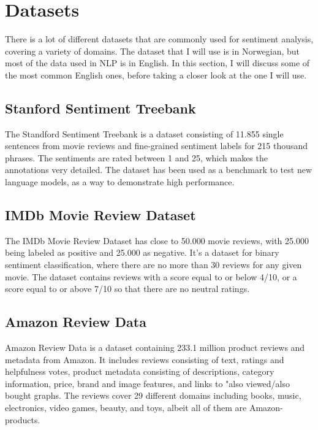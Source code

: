\documentclass{report}
\begin{document}


\section{Datasets}
There is a lot of different datasets that are commonly used for sentiment analysis, covering a variety of domains. The dataset that I will use is in Norwegian, but most of the data used in NLP is in English. In this section, I will discuss some of the most common English ones, before taking a closer look at the one I will use.
\subsection{Stanford Sentiment Treebank}
The Standford Sentiment Treebank \cite{socher2013recursive} is a dataset consisting of 11.855 single sentences from movie reviews and fine-grained sentiment labels for 215 thousand phrases. The sentiments are rated between 1 and 25, which makes the annotations very detailed. The dataset has been used as a benchmark to test new language models, as a way to demonstrate high performance.
\subsection{IMDb Movie Review Dataset}
The IMDb Movie Review Dataset \cite{maas-EtAl:2011:ACL-HLT2011} has close to 50.000 movie reviews, with 25.000 being labeled as positive and 25.000 as negative. It's a dataset for binary sentiment classification, where there are no more than 30 reviews for any given movie. The dataset contains reviews with a score equal to or below 4/10, or a score equal to or above 7/10 so that there are no neutral ratings.
\subsection{Amazon Review Data}
Amazon Review Data \cite{ni2019justifying} is a dataset containing 233.1 million product reviews and metadata from Amazon. It includes reviews consisting of text, ratings and helpfulness votes, product metadata consisting of descriptions, category information, price, brand and image features, and links to "also viewed/also bought graphs. The reviews cover 29 different domains including books, music, electronics, video games, beauty, and toys, albeit all of them are Amazon-products.
\end{document}
